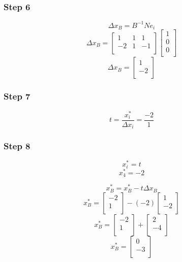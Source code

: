 \documentclass[14pt]{extarticle}
\begin{document}
\subsubsection*{Step 6}
\[
    \Delta x_B = B^{-1}N e_i
\]
\[
    \Delta x_B =
    \begin{bmatrix}
        1 & 1 & 1 \\
        -2 & 1 & -1 \\
    \end{bmatrix}
    \begin{bmatrix}
        1 \\
        0 \\
        0 \\
    \end{bmatrix}
\]
\[
    \Delta x_B =
    \begin{bmatrix}
        1 \\
        -2 \\
    \end{bmatrix}
\]

\subsubsection*{Step 7}
\[
    t = \frac{x^*_i}{\Delta x_i} = \frac{-2}{1}
\]

\subsubsection*{Step 8}
\[
    x^*_i = t
\]
\[
    x^*_4 = -2
\]

\[
    x^*_B = x^*_B - t \Delta x_B
\]
\[
    x^*_B = \begin{bmatrix}
        -2 \\
        1 \\
    \end{bmatrix}
    - (-2) \begin{bmatrix}
        1 \\
        -2 \\
    \end{bmatrix}
\]
\[
    x^*_B = \begin{bmatrix}
        -2 \\
        1 \\
    \end{bmatrix}
    + \begin{bmatrix}
        2 \\
        -4 \\
    \end{bmatrix}
\]
\[
    x^*_B = \begin{bmatrix}
        0 \\
        -3 \\
    \end{bmatrix}
\]
\end{document}
